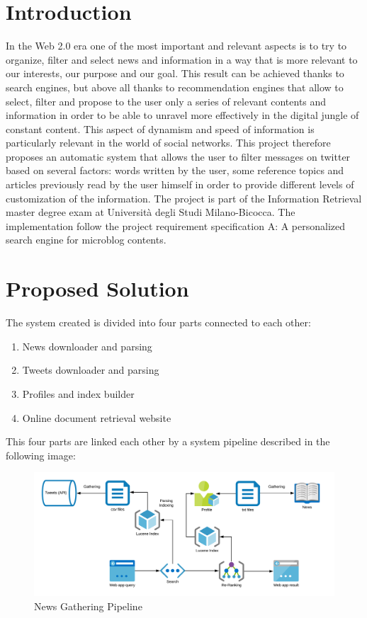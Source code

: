 \documentclass[11pt, english]{article}
\begin{document}
\tableofcontents
\newpage
\section{Introduction}

In the Web 2.0 era one of the most important and relevant aspects is to try to organize, filter and select news and information in a way that is more relevant to our interests, our purpose and our goal. 
\newline
This result can be achieved thanks to search engines, but above all thanks to recommendation engines that allow to select, filter and propose to the user only a series of relevant contents and information in order to be able to unravel more effectively in the digital jungle of constant content. 
\newline
This aspect of dynamism and speed of information is particularly relevant in the world of social networks.
\newline \break
This project therefore proposes an automatic system that allows the user to filter messages on twitter based on several factors: words written by the user, some reference topics and articles previously read by the user himself in order to provide different levels of customization of the information.
\newline \break
The project is part of the Information Retrieval master degree exam at Università degli Studi Milano-Bicocca.
The implementation follow the project requirement specification A: A personalized search engine for microblog contents.

\newpage

\section{Proposed Solution}

The system created is divided into four parts connected to each other:
\begin{enumerate}
\item News downloader and parsing
\item Tweets downloader and parsing
\item Profiles and index builder
\item Online document retrieval website
\end{enumerate}
This four parts are linked each other by a system pipeline described in the following image:

\begin{figure}[H]
  \includegraphics[width=16cm]{Resources/OverallArchitecture.png}
  \caption{News Gathering Pipeline} 
\end{figure}
\end{document}
